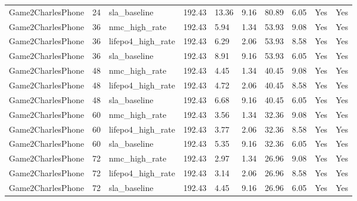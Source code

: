 \begin{longtable}{llllllllll}
Game2CharlesPhone & 24 & sla\_baseline & 192.43 & 13.36 & 9.16 & 80.89 & 6.05 & Yes & Yes \\
Game2CharlesPhone & 36 & nmc\_high\_rate & 192.43 & 5.94 & 1.34 & 53.93 & 9.08 & Yes & Yes \\
Game2CharlesPhone & 36 & lifepo4\_high\_rate & 192.43 & 6.29 & 2.06 & 53.93 & 8.58 & Yes & Yes \\
Game2CharlesPhone & 36 & sla\_baseline & 192.43 & 8.91 & 9.16 & 53.93 & 6.05 & Yes & Yes \\
Game2CharlesPhone & 48 & nmc\_high\_rate & 192.43 & 4.45 & 1.34 & 40.45 & 9.08 & Yes & Yes \\
Game2CharlesPhone & 48 & lifepo4\_high\_rate & 192.43 & 4.72 & 2.06 & 40.45 & 8.58 & Yes & Yes \\
Game2CharlesPhone & 48 & sla\_baseline & 192.43 & 6.68 & 9.16 & 40.45 & 6.05 & Yes & Yes \\
Game2CharlesPhone & 60 & nmc\_high\_rate & 192.43 & 3.56 & 1.34 & 32.36 & 9.08 & Yes & Yes \\
Game2CharlesPhone & 60 & lifepo4\_high\_rate & 192.43 & 3.77 & 2.06 & 32.36 & 8.58 & Yes & Yes \\
Game2CharlesPhone & 60 & sla\_baseline & 192.43 & 5.35 & 9.16 & 32.36 & 6.05 & Yes & Yes \\
Game2CharlesPhone & 72 & nmc\_high\_rate & 192.43 & 2.97 & 1.34 & 26.96 & 9.08 & Yes & Yes \\
Game2CharlesPhone & 72 & lifepo4\_high\_rate & 192.43 & 3.14 & 2.06 & 26.96 & 8.58 & Yes & Yes \\
Game2CharlesPhone & 72 & sla\_baseline & 192.43 & 4.45 & 9.16 & 26.96 & 6.05 & Yes & Yes \\
\bottomrule
\end{longtable}
